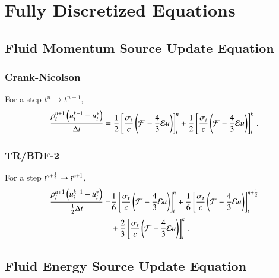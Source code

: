 \section{Fully Discretized Equations}
\subsection{Fluid Momentum Source Update Equation}
\subsubsection{Crank-Nicolson}
For a step $t^n\rightarrow t^{n+1}$,
\begin{equation}
  \frac{\rho_i^{n+1}\left(u_i^{k+1}-u_i^*\right)}{\dt} = 
   \half\left[\frac{\sigma_{t}}{c}\left(\F-\frac{4}{3}\E u\right)\right]_i^n
  +\half\left[\frac{\sigma_{t}}{c}\left(\F-\frac{4}{3}\E u\right)\right]_i^k
  \pep
\lequ{hydromCNfull}
\end{equation}

\subsubsection{TR/BDF-2}
For a step $t^{n+\frac{1}{2}}\rightarrow t^{n+1}$,
\begin{equation}\begin{split}
  \frac{\rho_i^{n+1}\left(u_i^{k+1}-u_i^*\right)}{\half\dt} =  
  & \sixth\left[\frac{\sigma_{t}}{c}\left(\F-\frac{4}{3}\E u\right)\right]_i^n
   +\sixth\left[\frac{\sigma_{t}}{c}\left(\F-\frac{4}{3}\E u\right)\right]_i^{n+\half}\\
  &+\frac{2}{3}\left[\frac{\sigma_t}{c}\left(\F-\frac{4}{3}\E u\right)\right]_i^k
  \pep
\lequ{hydromBDF2full}
\end{split}\end{equation}

\subsection{Fluid Energy Source Update Equation}
